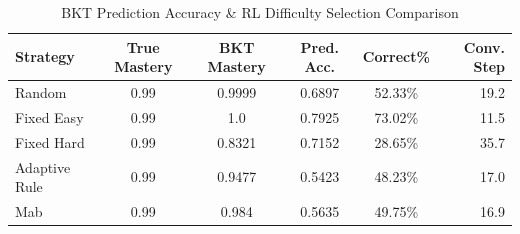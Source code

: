 \begin{table}[htbp]
\centering
\caption{BKT Prediction Accuracy \& RL Difficulty Selection Comparison}
\label{tab:bkt_rl}
\begin{tabular}{lccccr}
\toprule
Strategy & True Mastery & BKT Mastery & Pred. Acc. & Correct\% & Conv. Step \\
\midrule
Random & 0.99 & 0.9999 & 0.6897 & 52.33\% & 19.2 \\
Fixed Easy & 0.99 & 1.0 & 0.7925 & 73.02\% & 11.5 \\
Fixed Hard & 0.99 & 0.8321 & 0.7152 & 28.65\% & 35.7 \\
Adaptive Rule & 0.99 & 0.9477 & 0.5423 & 48.23\% & 17.0 \\
Mab & 0.99 & 0.984 & 0.5635 & 49.75\% & 16.9 \\
\bottomrule
\end{tabular}
\end{table}
